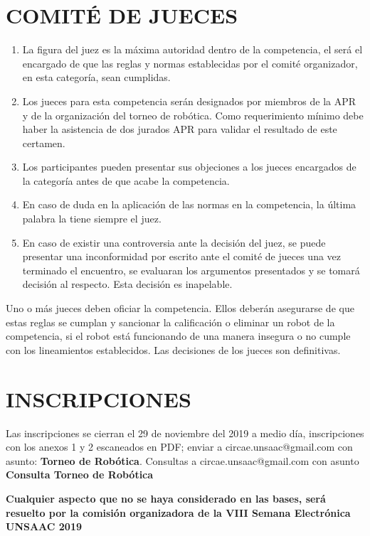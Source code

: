 \documentclass{article}
\begin{document}
\section{COMITÉ DE JUECES}

\begin{enumerate}
\item La figura del juez es la máxima autoridad dentro de la competencia, el será el encargado de que las reglas y normas establecidas por el comité organizador, en esta categoría, sean cumplidas.
\item Los jueces para esta competencia serán designados por miembros de la APR y de la organización del torneo de robótica. Como requerimiento mínimo debe haber la asistencia de dos jurados APR para validar el resultado de este certamen.
\item Los participantes pueden presentar sus objeciones a los jueces encargados de la categoría antes de que acabe la competencia.
\item En  caso  de  duda  en  la  aplicación de  las normas  en  la  competencia,  la  última palabra la tiene siempre el juez.
\item En caso de existir una controversia ante la decisión del juez, se puede presentar una inconformidad por escrito ante  el comité de jueces una vez terminado el encuentro, se evaluaran los argumentos presentados y se tomará decisión al respecto. Esta decisión es inapelable.
\end{enumerate}

Uno o más jueces deben oficiar la competencia. Ellos deberán asegurarse de que estas reglas se cumplan y sancionar la calificación o eliminar un robot de la competencia, si el robot está funcionando de una manera insegura o no cumple con los lineamientos establecidos. Las decisiones de los jueces son definitivas.

\section{INSCRIPCIONES}

Las inscripciones se cierran el 29 de noviembre del 2019 a medio día, inscripciones con los anexos 1 y 2 escaneados en PDF; enviar a circae.unsaac@gmail.com con asunto: \textbf{Torneo de Robótica}. Consultas a circae.unsaac@gmail.com con asunto \textbf{Consulta Torneo de Robótica}


\textbf{Cualquier aspecto que no se haya considerado en las bases, será resuelto por la comisión 
organizadora de la VIII Semana Electrónica UNSAAC 2019}
\end{document}
